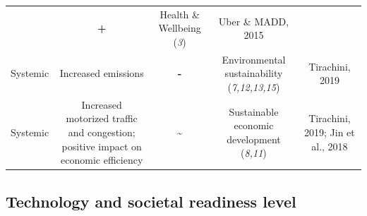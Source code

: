 \documentclass[
]{book}
\begin{document}
\begin{longtable}[]{@{}ccccc@{}}
\begin{minipage}[t]{0.16\columnwidth}
\end{minipage} & \begin{minipage}[t]{0.17\columnwidth}\centering
\textbf{+}\strut
\end{minipage} & \begin{minipage}[t]{0.17\columnwidth}\centering
Health \& Wellbeing (\emph{3})\strut
\end{minipage} & \begin{minipage}[t]{0.17\columnwidth}\centering
Uber \& MADD, 2015\strut
\end{minipage}\tabularnewline
\begin{minipage}[t]{0.17\columnwidth}\centering
Systemic\strut
\end{minipage} & \begin{minipage}[t]{0.16\columnwidth}\centering
Increased emissions\strut
\end{minipage} & \begin{minipage}[t]{0.17\columnwidth}\centering
\textbf{-}\strut
\end{minipage} & \begin{minipage}[t]{0.17\columnwidth}\centering
Environmental sustainability (\emph{7,12,13,15})\strut
\end{minipage} & \begin{minipage}[t]{0.17\columnwidth}\centering
Tirachini, 2019\strut
\end{minipage}\tabularnewline
\begin{minipage}[t]{0.17\columnwidth}\centering
Systemic\strut
\end{minipage} & \begin{minipage}[t]{0.16\columnwidth}\centering
Increased motorized traffic and congestion; positive impact on economic efficiency\strut
\end{minipage} & \begin{minipage}[t]{0.17\columnwidth}\centering
\textbf{\textasciitilde{}}\strut
\end{minipage} & \begin{minipage}[t]{0.17\columnwidth}\centering
Sustainable economic development (\emph{8,11})\strut
\end{minipage} & \begin{minipage}[t]{0.17\columnwidth}\centering
Tirachini, 2019; Jin et al., 2018\strut
\end{minipage}\tabularnewline
\bottomrule
\end{longtable}

\hypertarget{technology-and-societal-readiness-level-34}{%
\subsection*{Technology and societal readiness level}\label{technology-and-societal-readiness-level-34}}
\end{document}
